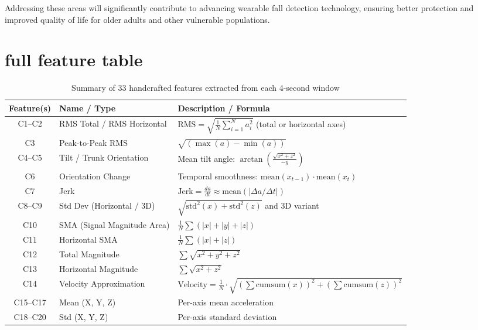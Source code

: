 \documentclass[conference]{IEEEtran}
\begin{document}
Addressing these areas will significantly contribute to advancing wearable fall detection technology, ensuring better protection and improved quality of life for older adults and other vulnerable populations.

\clearpage
\appendix
\section{full feature table}
\label{app:feature-table}
\begin{table}
\centering
\caption{Summary of 33 handcrafted features extracted from each 4-second window}
\renewcommand{\arraystretch}{1.4}
\small
\begin{tabular}{|c|p{4.5cm}|p{6.5cm}|}
\hline
\textbf{Feature(s)} & \textbf{Name / Type} & \textbf{Description / Formula} \\
\hline
C1--C2 & RMS Total / RMS Horizontal & 
$\text{RMS} = \sqrt{\frac{1}{N} \sum_{i=1}^N a_i^2}$ (total or horizontal axes) \\
\hline
C3 & Peak-to-Peak RMS & 
$\sqrt{(\max(a) - \min(a))}$ \\
\hline
C4--C5 & Tilt / Trunk Orientation & 
Mean tilt angle: $\arctan\left( \frac{\sqrt{x^2 + z^2}}{-y} \right)$ \\
\hline
C6 & Orientation Change & 
Temporal smoothness: $\text{mean}(x_{t-1}) \cdot \text{mean}(x_{t})$ \\
\hline
C7 & Jerk & 
$\text{Jerk} = \frac{d a}{dt} \approx \text{mean}(|\Delta a / \Delta t|)$ \\
\hline
C8--C9 & Std Dev (Horizontal / 3D) & 
$\sqrt{\text{std}^2(x) + \text{std}^2(z)}$ and 3D variant \\
\hline
C10 & SMA (Signal Magnitude Area) & 
$\frac{1}{N} \sum (|x| + |y| + |z|)$ \\
\hline
C11 & Horizontal SMA & 
$\frac{1}{N} \sum (|x| + |z|)$ \\
\hline
C12 & Total Magnitude & 
$\sum \sqrt{x^2 + y^2 + z^2}$ \\
\hline
C13 & Horizontal Magnitude & 
$\sum \sqrt{x^2 + z^2}$ \\
\hline
C14 & Velocity Approximation & 
$\text{Velocity} = \frac{1}{N} \cdot \sqrt{(\sum \text{cumsum}(x))^2 + (\sum \text{cumsum}(z))^2}$\\
\hline
C15--C17 & Mean (X, Y, Z) & 
Per-axis mean acceleration \\
\hline
C18--C20 & Std (X, Y, Z) & 
Per-axis standard deviation \\

\end{tabular}
\end{table}
\end{document}
